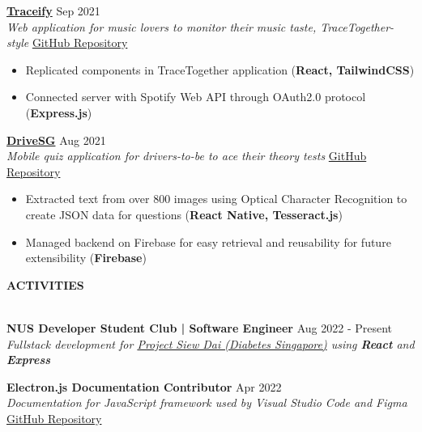 \documentclass[a4paper]{article}
\newcommand{\lineunder} {
    \vspace*{-8pt} \\
    \hspace*{-12pt} \hrulefill \\
}
\newcommand{\header} [1] {
    {\hspace*{-12pt}\vspace*{6pt} \large\textbf{#1}}
    \vspace*{-6pt} \lineunder
}
\begin{document}
\textbf{\href{https://traceify-client.netlify.app/}{Traceify}} \hfill Sep 2021\\
\textit{Web application for music lovers to monitor their music taste, TraceTogether-style} \hfill \href{https://github.com/jianrong7/traceify-client}{GitHub Repository}\\
\vspace{-2mm}
\begin{itemize} \itemsep 1pt
    \item Replicated components in TraceTogether application (\textbf{React, TailwindCSS})
    \item Connected server with Spotify Web API through OAuth2.0 protocol (\textbf{Express.js})
\end{itemize}

\textbf{\href{https://play.google.com/store/apps/details?id=com.jianrong7.drivesg}{DriveSG}} \hfill Aug 2021\\
\textit{Mobile quiz application for drivers-to-be to ace their theory tests} \hfill \href{https://github.com/jianrong7/drivesg}{GitHub Repository}\\
\vspace{-2mm}
\begin{itemize} \itemsep 1pt
    \item Extracted text from over 800 images using Optical Character Recognition to create JSON data for questions (\textbf{React Native, Tesseract.js})
    \item Managed backend on Firebase for easy retrieval and reusability for future extensibility (\textbf{Firebase})
\end{itemize}

\header{ACTIVITIES}
\vspace{2mm}

\textbf{NUS Developer Student Club | Software Engineer} \hfill Aug 2022 - Present\\
\textit{Fullstack development for \href{https://dsc.comp.nus.edu.sg/our-projects}{Project Siew Dai (Diabetes Singapore)} using \textbf{React} and \textbf{Express}}\\

\vspace{2mm}

\textbf{Electron.js Documentation Contributor} \hfill Apr 2022\\
\textit{Documentation for JavaScript framework used by Visual Studio Code and Figma} \hfill \href{https://github.com/electron/electronjs.org-new/pull/211}{GitHub Repository}\\
\end{document}
